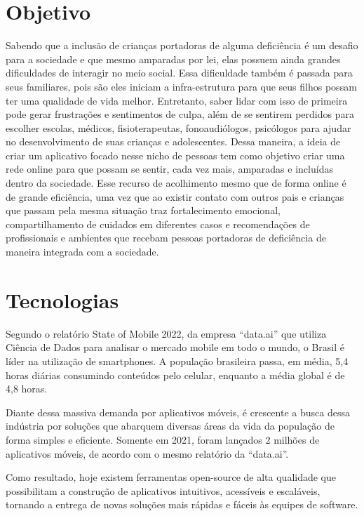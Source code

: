 \documentclass[
    12pt,               %
    openright,          %
    oneside,
    a4paper,            %
    paginasA3,  %
    BIBLATEX,           %
    REFINDENT,          %
    MODELO,             %
    TODO,               %
    english,            %
    brazil              %
    ]{ifsp-spo-inf-ctds} %
\begin{document}
\begin{apendicesenv}
\section{Objetivo}
Sabendo que a inclusão de crianças portadoras de alguma deficiência é um desafio para a sociedade e que mesmo amparadas por lei, elas possuem ainda grandes dificuldades de interagir no meio social. Essa dificuldade também é passada para seus familiares, pois são eles iniciam a infra-estrutura para que seus filhos possam ter uma qualidade de vida melhor. Entretanto, saber lidar com isso de primeira pode gerar frustrações e sentimentos de culpa, além de se sentirem perdidos para escolher escolas, médicos, fisioterapeutas, fonoaudiólogos, psicólogos para ajudar no desenvolvimento de suas crianças e adolescentes.  Dessa maneira, a ideia de criar um aplicativo focado nesse nicho de pessoas tem como objetivo criar uma rede online para que possam se sentir, cada vez mais, amparadas e incluídas dentro da sociedade. Esse recurso de acolhimento mesmo que de forma online é de grande eficiência, uma vez que ao existir contato com outros pais e crianças que passam pela mesma situação traz fortalecimento emocional, compartilhamento de cuidados em diferentes casos e recomendações de profissionais e ambientes que recebam pessoas portadoras de deficiência de maneira integrada com a sociedade.



\section{Tecnologias}
Segundo o relatório State of Mobile 2022, da empresa “data.ai” que utiliza Ciência de Dados para analisar o mercado mobile em todo o mundo, o Brasil é líder na utilização de smartphones. A população brasileira passa, em média, 5,4 horas diárias consumindo conteúdos pelo celular, enquanto a média global é de 4,8 horas. 

Diante dessa massiva demanda por aplicativos móveis, é crescente a busca dessa indústria por soluções que abarquem diversas áreas da vida da população de forma simples e eficiente. Somente em 2021, foram lançados 2 milhões de aplicativos móveis, de acordo com o mesmo relatório da “data.ai”.

Como resultado, hoje existem ferramentas open-source de alta qualidade que possibilitam a construção de aplicativos intuitivos, acessíveis e escaláveis, tornando a entrega de novas soluções mais rápidas e fáceis às equipes de software. 


\end{apendicesenv}
\end{document}
